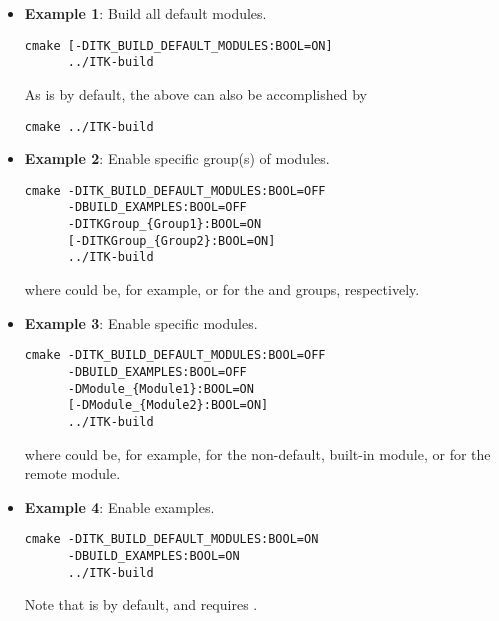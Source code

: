 \begin{itemize}
\item \textbf{Example 1}: Build all default modules.
\small
\begin{verbatim}
cmake [-DITK_BUILD_DEFAULT_MODULES:BOOL=ON]
      ../ITK-build
\end{verbatim}
\normalsize

As  is  by default, the above can
also be accomplished by
\begin{verbatim}
cmake ../ITK-build
\end{verbatim}

\item \textbf{Example 2}: Enable specific group(s) of modules.
\small
\begin{verbatim}
cmake -DITK_BUILD_DEFAULT_MODULES:BOOL=OFF
      -DBUILD_EXAMPLES:BOOL=OFF
      -DITKGroup_{Group1}:BOOL=ON
      [-DITKGroup_{Group2}:BOOL=ON]
      ../ITK-build
\end{verbatim}
\normalsize

where  could be, for example,
 or  for the
 and  groups, respectively.

\item \textbf{Example 3}: Enable specific modules.
\small
\begin{verbatim}
cmake -DITK_BUILD_DEFAULT_MODULES:BOOL=OFF
      -DBUILD_EXAMPLES:BOOL=OFF
      -DModule_{Module1}:BOOL=ON
      [-DModule_{Module2}:BOOL=ON]
      ../ITK-build
\end{verbatim}
\normalsize

where  could be, for example,  for
the non-default, built-in  module, or  for
the  remote module.

\item \textbf{Example 4}: Enable examples.
\small
\begin{verbatim}
cmake -DITK_BUILD_DEFAULT_MODULES:BOOL=ON
      -DBUILD_EXAMPLES:BOOL=ON
      ../ITK-build
\end{verbatim}
\normalsize

Note that  is  by default, and
 requires .

\end{itemize}

